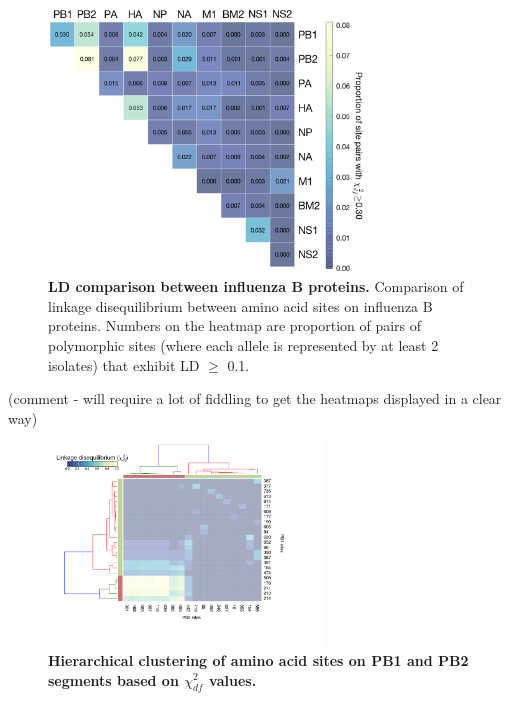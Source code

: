 \documentclass[11pt,oneside,letterpaper]{article}
\begin{document}
\begin{figure}[h]
	\centering	
	\includegraphics[width=0.75\textwidth]	{figures/InfB_segmentLD.png}
	\caption{\textbf{LD comparison between influenza B proteins.}
Comparison of linkage disequilibrium between amino acid sites on influenza B proteins.
Numbers on the heatmap are proportion of pairs of polymorphic sites (where each allele is represented by at least 2 isolates) that exhibit LD $\geq$ 0.1.}
	\label{segmentLD}
\end{figure}

(comment - will require a lot of fiddling to get the heatmaps displayed in a clear way)
\begin{figure}[h]
	\centering	
	\includegraphics[width=0.65\textwidth]	{figures/Chi_PB1_PB2.png}
	\caption{\textbf{Hierarchical clustering of amino acid sites on PB1 and PB2 segments based on $\chi^{2}_{df}$ values.}}
	\label{ChiPB1PB2}
\end{figure}
\end{document}
